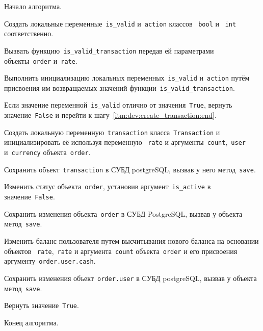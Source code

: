 \begin{enumerate_step}
    \item Начало алгоритма.

    \item Создать локальные переменные~\lstinline{is_valid} и~\lstinline{action} классов ~\lstinline{bool} и ~\lstinline{int} соответственно.
    \item Вызвать функцию~\lstinline{is_valid_transaction} передав ей параметрами объекты~\lstinline{order} и~\lstinline{rate}.
    \item Выполнить инициализацию локальных переменных~\lstinline{is_valid} и~\lstinline{action}
    путём присвоения им возвращаемых значений функции~\lstinline{is_valid_transaction}.
    \item Если значение переменной~\lstinline{is_valid} отлично от значения~\lstinline{True}, вернуть значение~\lstinline{False} и
    перейти к шагу~\ref{itm:dev:create_transaction:end}.

    \item Создать локальную переменную~\lstinline{transaction} класса~\lstinline{Transaction} и инициализировать её используя переменную
    ~\lstinline{rate} и аргументы~\lstinline{count},~\lstinline{user} и~\lstinline{currency} объекта~\lstinline{order}.
    \item Сохранить объект~\lstinline{transaction} в СУБД postgreSQL, вызвав у него метод~\lstinline{save}.

    \item Изменить статус объекта~\lstinline{order}, установив аргумент~\lstinline{is_active} в значение~\lstinline{False}.
    \item Сохранить изменения объекта~\lstinline{order} в СУБД PostgreSQL, вызвав у объекта метод~\lstinline{save}.

    \item Изменить баланс пользователя путем высчитывания нового баланса на основании объектов
    ~\lstinline{rate},~\lstinline{rate} и аргумента~\lstinline{count} объекта~\lstinline{order} и его присвоения аргументу~\lstinline{order.user.cash}.
    \item Сохранить изменения объект~\lstinline{order.user} в СУБД postgreSQL, вызвав у объекта метод~\lstinline{save}.
    \item Вернуть значение~\lstinline{True}.

    \item\label{itm:dev:create_transaction:end} Конец алгоритма.
\end{enumerate_step}

